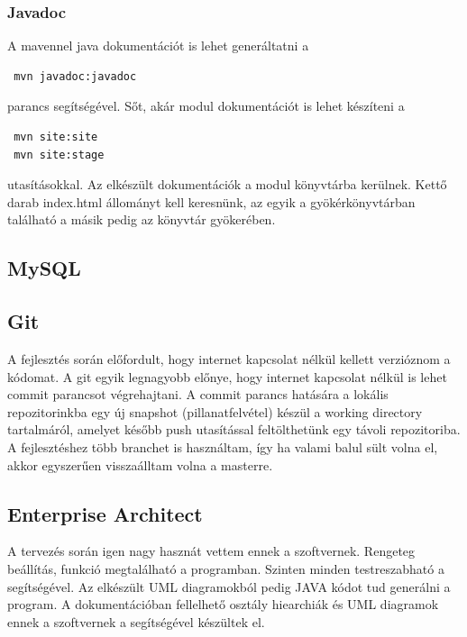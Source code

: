 \subsubsection{Javadoc}
A mavennel java dokumentációt is lehet generáltatni a
\begin{verbatim}
 mvn javadoc:javadoc
\end{verbatim}
 parancs segítségével. Sőt, akár modul dokumentációt is lehet készíteni a 
\begin{verbatim}
 mvn site:site
 mvn site:stage
\end{verbatim}
utasításokkal. Az elkészült dokumentációk a modul  könyvtárba kerülnek. Kettő darab index.html állományt kell keresnünk, az egyik a gyökérkönyvtárban található a másik pedig az  könyvtár gyökerében.
 
\subsection{MySQL}
\subsection{Git}
A fejlesztés során előfordult, hogy internet kapcsolat nélkül kellett verzióznom a kódomat. A git egyik legnagyobb előnye, hogy internet kapcsolat nélkül is lehet commit parancsot végrehajtani. A commit parancs hatására a lokális repozitorinkba egy új snapshot (pillanatfelvétel) készül a working directory tartalmáról, amelyet később push utasítással feltölthetünk egy távoli repozitoriba. A fejlesztéshez több branchet is használtam, így ha valami balul sült volna el, akkor egyszerűen visszaálltam volna a masterre.

\subsection{Enterprise Architect}
A tervezés során igen nagy hasznát vettem ennek a szoftvernek. Rengeteg beállítás, funkció megtalálható a programban. Szinten minden testreszabható a segítségével. Az elkészült UML diagramokból pedig JAVA kódot tud generálni a program. A dokumentációban fellelhető osztály hiearchiák és UML diagramok ennek a szoftvernek a segítségével készültek el.

